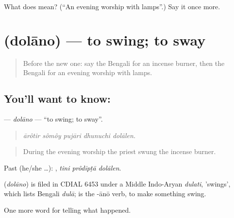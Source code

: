 \begin{tcolorbox}[breakable,colback=teal!4,colframe=teal!35!black,title={Before you move on}]
What does  mean? (\textquotedblleft{}An evening worship with lamps\textquotedblright{}.) Say it once more.
\end{tcolorbox}
\section[\texorpdfstring{\bn{দোলানো} (dolāno)}{দোলানো (dolāno)}]{ (dolāno) — to swing; to sway}

\label{lesson:BN-C307-dolano}



\begin{quote}
Before the new one: say the Bengali for an incense burner, then the Bengali for an evening worship with lamps.
\end{quote}

\subsection*{You'll want to know: }
\textbf{} — \emph{dolāno} — \textquotedblleft{}to swing; to sway\textquotedblright{}.

\begin{quote}
    
\end{quote}

\begin{quote}
\emph{ārôtir sômôy pujāri dhunuchi dolālen.}
\end{quote}

\begin{quote}
During the evening worship the priest swung the incense burner.
\end{quote}

Past (he/she …):   , \emph{tini prôdīpṭā dolālen}.

\begin{cousinweb}
\textbf{} (\emph{dolāno}) is filed in CDIAL 6453 under a Middle Indo-Aryan \emph{dulati}, 'swings', which lists Bengali \emph{dulā};  is the -ānō verb, to make something swing.
\end{cousinweb}

\begin{grammarlens}[title={What you've built}]
One more word for telling what happened.
\end{grammarlens}

